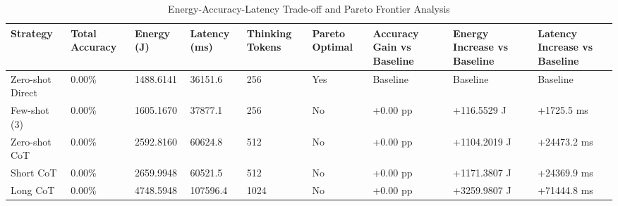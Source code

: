 \begin{table}
\caption{Energy-Accuracy-Latency Trade-off and Pareto Frontier Analysis}
\label{tab:tradeoff_comparison}
\begin{tabular}{lllllllll}
\toprule
Strategy & Total Accuracy & Energy (J) & Latency (ms) & Thinking Tokens & Pareto Optimal & Accuracy Gain vs Baseline & Energy Increase vs Baseline & Latency Increase vs Baseline \\
\midrule
Zero-shot Direct & 0.00\% & 1488.6141 & 36151.6 & 256 & Yes & Baseline & Baseline & Baseline \\
Few-shot (3) & 0.00\% & 1605.1670 & 37877.1 & 256 & No & +0.00 pp & +116.5529 J & +1725.5 ms \\
Zero-shot CoT & 0.00\% & 2592.8160 & 60624.8 & 512 & No & +0.00 pp & +1104.2019 J & +24473.2 ms \\
Short CoT & 0.00\% & 2659.9948 & 60521.5 & 512 & No & +0.00 pp & +1171.3807 J & +24369.9 ms \\
Long CoT & 0.00\% & 4748.5948 & 107596.4 & 1024 & No & +0.00 pp & +3259.9807 J & +71444.8 ms \\
\bottomrule
\end{tabular}
\end{table}
